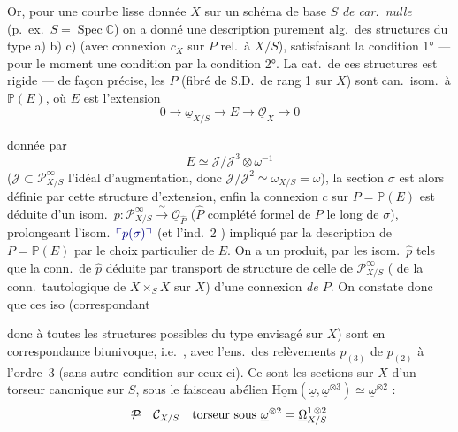 \documentclass[11pt,a4paper]{article}
\begin{document}

Or, pour une courbe lisse donnée $X$ sur un schéma de base $S$ \emph{de car.\ nulle} (p.\ ex.\ $S = \operatorname{Spec}\mathbb{C}$) on a donné une description purement alg.\ des structures du type a) b) c) (avec connexion $c_X$ sur $P$ rel.\ à $X/S$), satisfaisant la condition 1° — pour le moment une condition par la condition 2°. La cat.\ de ces structures est rigide — de façon précise, les $P$ (fibré de S.D.\ de rang 1 sur $X$) sont can.\ isom.\ à $\mathbb{P}(E)$, où $E$ est l'extension
\[
0 \longrightarrow \underline{\omega}_{X/S} \longrightarrow E \longrightarrow \underline{\mathcal{O}}_X \longrightarrow 0
\]

donnée par
\[
E \simeq \mathcal{J}/\mathcal{J}^{3} \otimes \omega^{-1}
\]
($\mathcal{J} \subset \mathcal{P}^{\infty}_{X/S}$ l'idéal d'augmentation, donc $\mathcal{J}/\mathcal{J}^{2} \simeq \omega_{X/S} = \omega$), la section $\sigma$ est alors définie par cette structure d'extension, enfin la connexion $c$ sur $P = \mathbb{P}(E)$ est déduite d'un isom.\ $p : \mathcal{P}^{\infty}_{X/S} \xrightarrow{\ \sim\ } \underline{\mathcal{O}}_{\hat{P}}$ ($\hat{P}$ complété formel de $P$ le long de $\sigma$), prolongeant l'isom.\ $\add{p(\sigma)}$ (et l'ind.\ 2 ) impliqué par la description de $P = \mathbb{P}(E)$ par le choix particulier de $E$. On a un produit, par les isom.\ $\hat{p}$ tels que la conn.\ de $\hat{p}$ déduite par transport de structure de celle de $\mathcal{P}^{\infty}_{X/S}$ ( de la conn.\ tautologique de  $X \times_S X$ sur $X$)   d'une connexion \emph{de $P$}. On constate donc que ces iso (correspondant

donc à toutes les structures possibles du type envisagé sur $X$) sont en correspondance biunivoque, i.e.\ , avec l'ens.\ des relèvements $p_{(3)}$ de $p_{(2)}$ à l'ordre~3 (sans autre condition sur ceux-ci). Ce sont  les sections sur $X$ d'un torseur canonique sur $S$, sous le faisceau abélien $\underline{\mathrm{Hom}}(\underline{\omega}, \underline{\omega}^{\otimes 3}) \simeq \underline{\omega}^{\otimes 2}$ :
\[
\text{\struck{$\mathcal{P}$}} \quad \mathcal{C}_{X/S} \quad \text{torseur sous } \underline{\omega}^{\otimes 2} = \underline{\Omega}^{1\,\otimes 2}_{X/S}
\]
\end{document}
